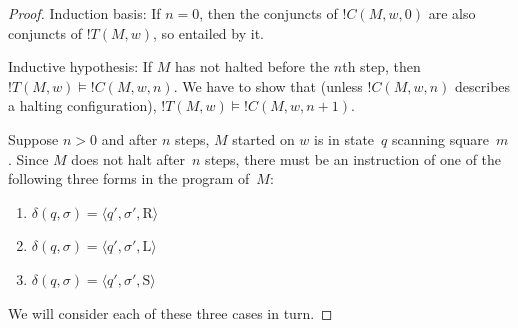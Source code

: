 \documentclass[10pt,a4paper]{article}
\theoremstyle{plain}
\theoremstyle{definition}
\theoremstyle{remark}
\newcommand*{\ollabel}[1]{\label{#1}}
\providecommand{\Entails}{\mathrel{\models}}
\providecommand{\tuple}[1]{\langle #1 \rangle}
\providecommand{\TMstay}{\mathrm{S}}
\providecommand{\TMright}{\mathrm{R}}
\providecommand{\TMleft}{\mathrm{L}}
\begin{document}
\begin{proof}
Induction basis: If $n = 0$, then the conjuncts of $!C(M, w, 0)$ are
also conjuncts of $!T(M, w)$, so entailed by it.

Inductive hypothesis: If $M$ has not halted before the $n$th step,
then $!T(M,w) \Entails !C(M, w, n)$. We have to show that (unless
$!C(M, w, n)$ describes a halting configuration), $!T(M, w) \Entails
!C(M, w, n+1)$.

Suppose $n > 0$ and after $n$ steps, $M$ started on $w$ is in
state~$q$ scanning square~$m$. Since $M$ does not halt after~$n$
steps, there must be an instruction of one of the following three
forms in the program of~$M$:

\begin{enumerate} 
\item \ollabel{right} $\delta(q, \sigma) = \tuple{q', \sigma', \TMright}$

\item \ollabel{left} $\delta(q, \sigma) = \tuple{q', \sigma', \TMleft}$

\item \ollabel{stay} $\delta(q, \sigma) = \tuple{q', \sigma', \TMstay}$
\end{enumerate}

We will consider each of these three cases in turn. 


\end{proof}
\end{document}
